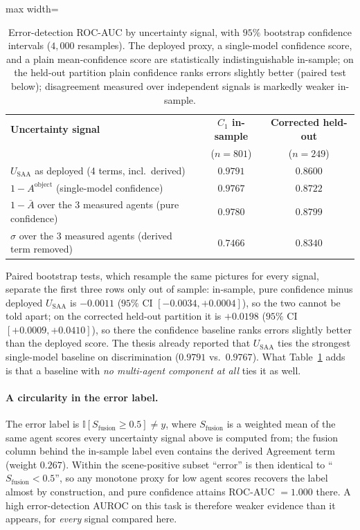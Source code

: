 \documentclass[12pt,a4paper]{report}
\begin{document}
\begin{table}[!htbp]
\centering
\caption[Error-detection ROC-AUC by uncertainty signal, with bootstrap intervals]{Error-detection ROC-AUC by uncertainty signal, with $95\%$ bootstrap confidence intervals ($4{,}000$ resamples). The deployed proxy, a single-model confidence score, and a plain mean-confidence score are statistically indistinguishable in-sample; on the held-out partition plain confidence ranks errors slightly better (paired test below); disagreement measured over independent signals is markedly weaker in-sample.}
\label{tab:signal_decomposition}
\small
\begin{adjustbox}{max width=\textwidth}
\begin{tabular}{lcc}
\toprule
\textbf{Uncertainty signal} & \textbf{$C_1$ in-sample} & \textbf{Corrected held-out} \\
 & ($n=801$) & ($n=249$) \\
\midrule
$U_{\text{SAA}}$ as deployed (4 terms, incl.\ derived) & $\mathbf{0.9791}$ & $\mathbf{0.8600}$ \\
$1 - A^{\text{object}}$ (single-model confidence) & $0.9767$ & $0.8722$ \\
$1 - \bar{A}$ over the 3 measured agents (pure confidence) & $0.9780$ & $0.8799$ \\
$\sigma$ over the 3 measured agents (derived term removed) & $0.7466$ & $0.8340$ \\
\bottomrule
\end{tabular}
\end{adjustbox}
\end{table}

Paired bootstrap tests, which resample the same pictures for every signal, separate the first three rows only out of sample: in-sample, pure confidence minus deployed $U_{\text{SAA}}$ is $-0.0011$ ($95\%$ CI $[-0.0034, +0.0004]$), so the two cannot be told apart; on the corrected held-out partition it is $+0.0198$ ($95\%$ CI $[+0.0009, +0.0410]$), so there the confidence baseline ranks errors slightly better than the deployed score. The thesis already reported that $U_{\text{SAA}}$ ties the strongest single-model baseline on discrimination ($0.9791$ vs.\ $0.9767$). What Table~\ref{tab:signal_decomposition} adds is that a baseline with \emph{no multi-agent component at all} ties it as well.

\paragraph{A circularity in the error label.} The error label is $\mathbb{I}[S_{\text{fusion}} \ge 0.5] \ne y$, where $S_{\text{fusion}}$ is a weighted mean of the same agent scores every uncertainty signal above is computed from; the fusion column behind the in-sample label even contains the derived Agreement term (weight $0.267$). Within the scene-positive subset ``error'' is then identical to ``$S_{\text{fusion}} < 0.5$'', so any monotone proxy for low agent scores recovers the label almost by construction, and pure confidence attains ROC-AUC $=1.000$ there. A high error-detection AUROC on this task is therefore weaker evidence than it appears, for \emph{every} signal compared here.
\end{document}
